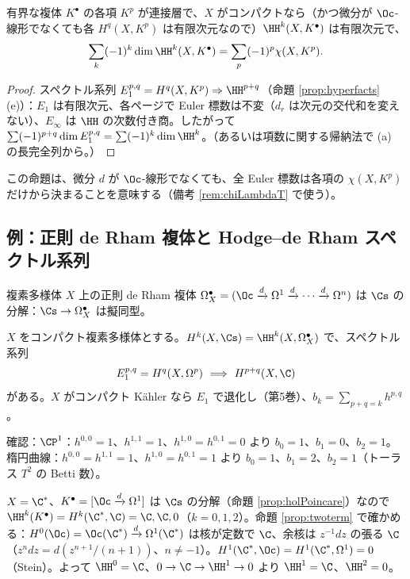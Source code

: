 \begin{prop}\label{prop:hyperchi}\tP
有界な複体 $K^\bullet$ の各項 $K^p$ が連接層で、$X$ がコンパクトなら（かつ微分が $\Oc$-線形でなくても各 $H^q(X,K^p)$ は有限次元なので）$\HH^k(X,K^\bullet)$ は有限次元で、
\[
\sum_k(-1)^k\dim\HH^k(X,K^\bullet)=\sum_p(-1)^p\chi(X,K^p).
\]
\end{prop}
\begin{proof}
スペクトル系列 $E_1^{p,q}=H^q(X,K^p)\Rightarrow\HH^{p+q}$（命題 \ref{prop:hyperfacts}(e)）：$E_1$ は有限次元、各ページで Euler 標数は不変（$d_r$ は次元の交代和を変えない）、$E_\infty$ は $\HH$ の次数付き商。したがって $\sum(-1)^{p+q}\dim E_1^{p,q}=\sum(-1)^k\dim\HH^k$。（あるいは項数に関する帰納法で (a) の長完全列から。）\qedhere
\end{proof}
この命題は、微分 $d$ が $\Oc$-線形でなくても、全 Euler 標数は各項の $\chi(X,K^p)$ だけから決まることを意味する（備考 \ref{rem:chiLambdaT} で使う）。

\subsection{例：正則 de Rham 複体と Hodge--de Rham スペクトル系列}
\begin{prop}\label{prop:holPoincare}\tC
複素多様体 $X$ 上の正則 de Rham 複体 $\Omega^\bullet_X=(\Oc\xrightarrow{d}\Omega^1\xrightarrow{d}\cdots\xrightarrow{d}\Omega^n)$ は $\Cs$ の分解：$\Cs\to\Omega^\bullet_X$ は擬同型。
\end{prop}
\begin{cor}\label{cor:HdR}\tC
$X$ をコンパクト複素多様体とする。$H^k(X,\Cs)=\HH^k(X,\Omega^\bullet_X)$ で、スペクトル系列
\[
E_1^{p,q}=H^q(X,\Omega^p)\ \Longrightarrow\ H^{p+q}(X,\C)
\]
がある。$X$ がコンパクト Kähler なら $E_1$ で退化し（第5巻）、$b_k=\sum_{p+q=k}h^{p,q}$。
\end{cor}
確認：$\CP^1$：$h^{0,0}=1$、$h^{1,1}=1$、$h^{1,0}=h^{0,1}=0$ より $b_0=1$、$b_1=0$、$b_2=1$。楕円曲線：$h^{0,0}=h^{1,1}=1$、$h^{1,0}=h^{0,1}=1$ より $b_0=1$、$b_1=2$、$b_2=1$（トーラス $T^2$ の Betti 数）。
\begin{ex}\label{ex:holdR}\tP
$X=\C^*$、$K^\bullet=[\Oc\xrightarrow{d}\Omega^1]$ は $\Cs$ の分解（命題 \ref{prop:holPoincare}）なので $\HH^k(K^\bullet)=H^k(\C^*,\C)=\C,\C,0$（$k=0,1,2$）。命題 \ref{prop:twoterm} で確かめる：$H^0(\Oc)=\Oc(\C^*)\xrightarrow{d}\Omega^1(\C^*)$ は核が定数で $\C$、余核は $z^{-1}dz$ の張る $\C$（$z^ndz=d(z^{n+1}/(n+1))$、$n\ne-1$）。$H^1(\C^*,\Oc)=H^1(\C^*,\Omega^1)=0$（Stein）。よって $\HH^0=\C$、$0\to\C\to\HH^1\to0$ より $\HH^1=\C$、$\HH^2=0$。
\end{ex}

